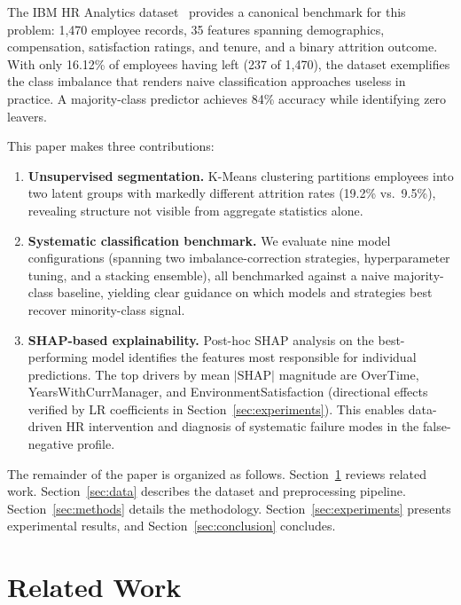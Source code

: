 \documentclass{article}
\begin{document}
The IBM HR Analytics dataset~\citep{ibmhr2015} provides a canonical
benchmark for this problem: 1,470 employee records, 35 features spanning
demographics, compensation, satisfaction ratings, and tenure, and a binary
attrition outcome. With only 16.12\% of employees having left (237 of
1,470), the dataset exemplifies the class imbalance that renders naive
classification approaches useless in practice. A majority-class predictor achieves 84\% accuracy while identifying zero leavers.

This paper makes three contributions:
\begin{enumerate}
  \item \textbf{Unsupervised segmentation.} K-Means clustering partitions
        employees into two latent groups with markedly different attrition
        rates (19.2\% vs.\ 9.5\%), revealing structure not visible from
        aggregate statistics alone.
  \item \textbf{Systematic classification benchmark.} We evaluate nine
        model configurations (spanning two imbalance-correction
        strategies, hyperparameter tuning, and a stacking ensemble), all
        benchmarked against a naive majority-class baseline, yielding
        clear guidance on which models and strategies best recover
        minority-class signal.
  \item \textbf{SHAP-based explainability.} Post-hoc SHAP analysis on the
        best-performing model identifies the features most responsible for
        individual predictions. The top drivers by mean $|\text{SHAP}|$ magnitude
        are OverTime, YearsWithCurrManager, and EnvironmentSatisfaction
        (directional effects verified by LR coefficients in
        Section~\ref{sec:experiments}). This enables data-driven HR
        intervention and diagnosis of systematic failure modes in the
        false-negative profile.
\end{enumerate}

The remainder of the paper is organized as follows. Section~\ref{sec:related}
reviews related work. Section~\ref{sec:data} describes the dataset and
preprocessing pipeline. Section~\ref{sec:methods} details the methodology.
Section~\ref{sec:experiments} presents experimental results, and
Section~\ref{sec:conclusion} concludes.

\section{Related Work}
\label{sec:related}
\end{document}
